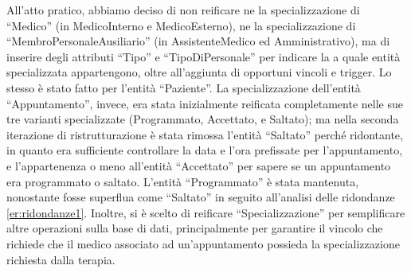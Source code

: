 \documentclass[11pt]{article}
\begin{document}
All'atto pratico, abbiamo deciso di non reificare ne la specializzazione di ``Medico'' (in MedicoInterno e MedicoEsterno), ne la specializzazione di ``MembroPersonaleAusiliario'' (in AssistenteMedico ed Amministrativo), ma di inserire degli attributi ``Tipo'' e ``TipoDiPersonale'' per indicare la a quale entità specializzata appartengono, oltre all'aggiunta di opportuni vincoli e trigger. Lo stesso è stato fatto per l'entità ``Paziente''.
La specializzazione dell'entità ``Appuntamento'', invece, era stata inizialmente reificata completamente nelle sue tre varianti specializzate (Programmato, Accettato, e Saltato); ma nella seconda iterazione di ristrutturazione è stata rimossa l'entità ``Saltato'' perché ridontante, in quanto era sufficiente controllare la data e l'ora prefissate per l'appuntamento, e l'appartenenza o meno all'entità ``Accettato'' per sapere se un appuntamento era programmato o saltato. L'entità ``Programmato'' è stata mantenuta, nonostante fosse superflua come ``Saltato'' in seguito all'analisi delle ridondanze \ref{er:ridondanze1}. Inoltre, si è scelto di reificare ``Specializzazione'' per semplificare altre operazioni sulla base di dati, principalmente per garantire il vincolo che richiede che il medico associato ad un'appuntamento possieda la specializzazione richiesta dalla terapia.
\end{document}
